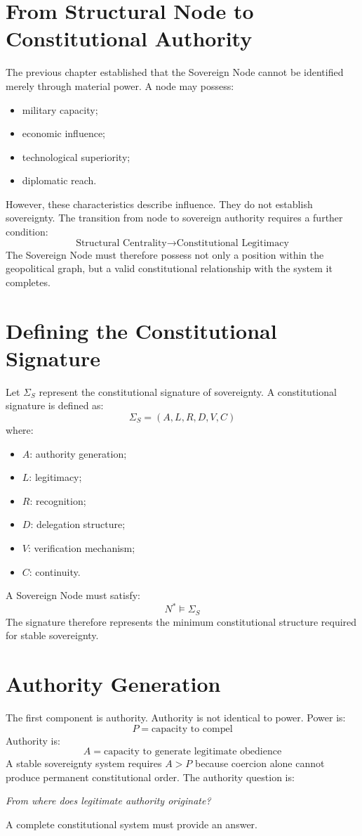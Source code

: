\documentclass[11pt,openany]{book}
\theoremstyle{plain}
\theoremstyle{definition}
\begin{document}
\section{From Structural Node to Constitutional Authority}

The previous chapter established that the Sovereign Node cannot be identified merely through material power. A node may possess:
\begin{itemize}
\item military capacity;
\item economic influence;
\item technological superiority;
\item diplomatic reach.
\end{itemize}
However, these characteristics describe influence. They do not establish sovereignty. The transition from node to sovereign authority requires a further condition:
\[
\text{Structural Centrality} \longrightarrow \text{Constitutional Legitimacy}
\]
The Sovereign Node must therefore possess not only a position within the geopolitical graph, but a valid constitutional relationship with the system it completes.

\section{Defining the Constitutional Signature}

Let \(\Sigma_S\) represent the constitutional signature of sovereignty. A constitutional signature is defined as:
\[
\Sigma_S = (A, L, R, D, V, C)
\]
where:
\begin{itemize}
\item \(A\): authority generation;
\item \(L\): legitimacy;
\item \(R\): recognition;
\item \(D\): delegation structure;
\item \(V\): verification mechanism;
\item \(C\): continuity.
\end{itemize}
A Sovereign Node must satisfy:
\[
N^* \models \Sigma_S
\]
The signature therefore represents the minimum constitutional structure required for stable sovereignty.

\section{Authority Generation}

The first component is authority. Authority is not identical to power. Power is:
\[
P = \text{capacity to compel}
\]
Authority is:
\[
A = \text{capacity to generate legitimate obedience}
\]
A stable sovereignty system requires \(A > P\) because coercion alone cannot produce permanent constitutional order. The authority question is:
\begin{center}
\textit{
From where does legitimate authority originate?
}
\end{center}
A complete constitutional system must provide an answer.
\end{document}
